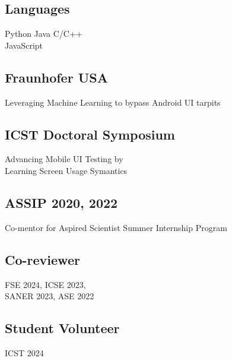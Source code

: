 \documentclass[a4paper]{MagicalCV}
\begin{document}
\begin{minipage}[t]{0.30\textwidth}
\subsection{Languages}
Python \textbullet{}   Java \textbullet{} C/C++ \textbullet{}\\ 
JavaScript
\sectionsep \\
\subsection{Fraunhofer USA}
Leveraging Machine Learning to bypass Android UI tarpits \\
\vspace{\topsep}
\sectionsep 
\subsection{ICST Doctoral Symposium}
Advancing Mobile UI Testing by \\ Learning Screen Usage Symantics
\sectionsep \\
\subsection{ASSIP 2020, 2022}
Co-mentor for Aspired Scientist Summer Internship Program

\subsection{Co-reviewer}
FSE 2024, ICSE 2023, \\SANER 2023, ASE 2022
\subsection{Student Volunteer}
ICST 2024

\sectionsep
\sectionsep
\end{minipage} 
\hfill
\end{document}
